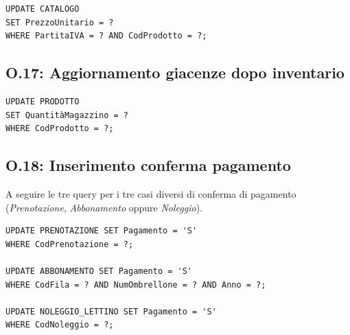 \begin{lstlisting}[caption={O.16: Aggiornamento prezzi catalogo di un fornitore}]
UPDATE CATALOGO
SET PrezzoUnitario = ?
WHERE PartitaIVA = ? AND CodProdotto = ?;
\end{lstlisting}

\subsection*{O.17: Aggiornamento giacenze dopo inventario}

\begin{lstlisting}[caption={O.17: Aggiornamento giacenze dopo inventario}]
UPDATE PRODOTTO
SET QuantitàMagazzino = ?
WHERE CodProdotto = ?;
\end{lstlisting}

\clearpage

\subsection*{O.18: Inserimento conferma pagamento}

A seguire le tre query per i tre casi diversi di conferma di pagamento (\textit{Prenotazione}, 
\textit{Abbonamento} oppure \textit{Noleggio}).

\begin{lstlisting}[caption={O.18: Inserimento conferma pagamento}]
UPDATE PRENOTAZIONE SET Pagamento = 'S' 
WHERE CodPrenotazione = ?;

UPDATE ABBONAMENTO SET Pagamento = 'S' 
WHERE CodFila = ? AND NumOmbrellone = ? AND Anno = ?;

UPDATE NOLEGGIO_LETTINO SET Pagamento = 'S' 
WHERE CodNoleggio = ?;
\end{lstlisting}